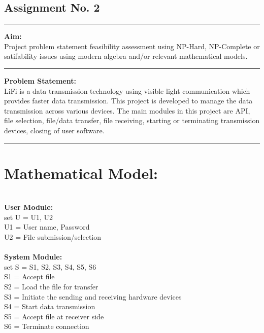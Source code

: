 \documentclass[11pt,a4paper]{report}
\begin{document}
\begin{center}
\section*{Assignment No. 2}
\end{center}
\rule{\textwidth}{1pt}
\textbf{Aim:\\} Project problem statement feasibility assessment using NP-Hard, NP-Complete or satifability issues using modern algebra and/or relevant mathematical models.\\
\rule{\textwidth}{1pt}
\textbf{Problem Statement: \\}  LiFi is a data transmission technology using visible light communication which provides faster data transmission. This project is developed to manage the data transmission across various devices. The main modules in this project are API, file selection, file/data transfer, file receiving, starting or terminating transmission devices, closing of user software.\\
\rule{\textwidth}{1pt}
\section{Mathematical Model:}

\textbf{\\User Module:\\}
set U = U1, U2\\
U1 = User name, Password\\
U2 = File submission/selection\\
\textbf{\\System Module:\\}
set S = S1, S2, S3, S4, S5, S6\\
S1 = Accept file\\
S2 = Load the file for transfer\\
S3 = Initiate the sending and receiving hardware devices\\
S4 = Start data transmission \\
S5 = Accept file at receiver side\\
S6 = Terminate connection\\
\end{document}
